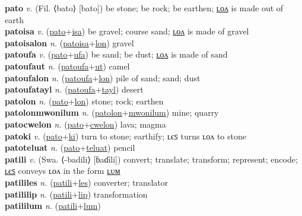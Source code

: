 \textbf{pato} \textit{v.} (Fil. ⟨bato⟩ [bato])
be stone; be rock; be earthen; \hyperref[patolon]{ʟᴏᴧ} is made out of earth \label{pato} \\
\textbf{patoisa} \textit{v.} (\hyperref[pato]{pato}+\hyperref[isa]{isa})
be gravel; course sand; \hyperref[patoisalon]{ʟᴏᴧ} is made of gravel \label{patoisa} \\
\textbf{patoisalon} \textit{n.} (\hyperref[patoisa]{patoisa}+\hyperref[lon]{lon})
gravel \label{patoisalon} \\
\textbf{patoufa} \textit{v.} (\hyperref[pato]{pato}+\hyperref[ufa]{ufa})
be sand; be dust; \hyperref[patoufalon]{ʟᴏᴧ} is made of sand \label{patoufa} \\
\textbf{patoufaut} \textit{n.} (\hyperref[patoufa]{patoufa}+\hyperref[ut]{ut})
camel \label{patoufaut} \\
\textbf{patoufalon} \textit{n.} (\hyperref[patoufa]{patoufa}+\hyperref[lon]{lon})
pile of sand; sand; dust \label{patoufalon} \\
\textbf{patoufatayl} \textit{n.} (\hyperref[patoufa]{patoufa}+\hyperref[tayl]{tayl})
desert \label{patoufatayl} \\
\textbf{patolon} \textit{n.} (\hyperref[pato]{pato}+\hyperref[lon]{lon})
stone; rock; earthen \label{patolon} \\
\textbf{patolonmwonilum} \textit{n.} (\hyperref[patolon]{patolon}+\hyperref[mwonilum]{mwonilum})
mine; quarry \label{patolonmwonilum} \\
\textbf{patocwelon} \textit{n.} (\hyperref[pato]{pato}+\hyperref[cwelon]{cwelon})
lava; magma \label{patocwelon} \\
\textbf{patoki} \textit{v.} (\hyperref[pato]{pato}+\hyperref[ki]{ki})
turn to stone; earthify; ʟєꜱ turns ʟᴏᴧ to stone \label{patoki} \\
\textbf{patoteluat} \textit{n.} (\hyperref[pato]{pato}+\hyperref[teluat]{teluat})
pencil \label{patoteluat} \\
\textbf{patili} \textit{v.} (Swa. ⟨-badili⟩ [ɓaɗili])
convert; translate; transform; represent; encode; \hyperref[patililes]{ʟєꜱ} conveys ʟᴏᴧ in the form \hyperref[patililum]{ʟᴜᴍ} \label{patili} \\
\textbf{patililes} \textit{n.} (\hyperref[patili]{patili}+\hyperref[les]{les})
converter; translator \label{patililes} \\
\textbf{patililip} \textit{n.} (\hyperref[patili]{patili}+\hyperref[lip]{lip})
transformation \label{patililip} \\
\textbf{patililum} \textit{n.} (\hyperref[patili]{patili}+\hyperref[lum]{lum})
